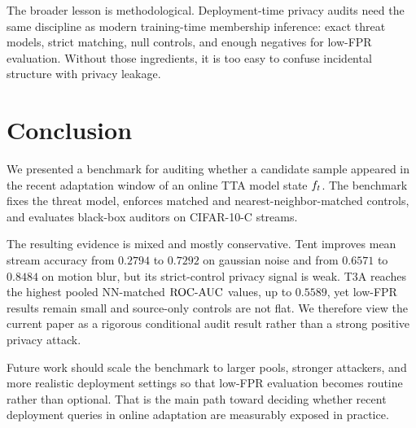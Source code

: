 The broader lesson is methodological. Deployment-time privacy audits need the same discipline as modern training-time membership inference: exact threat models, strict matching, null controls, and enough negatives for low-FPR evaluation. Without those ingredients, it is too easy to confuse incidental structure with privacy leakage.

\section{Conclusion}
\label{sec:conclusion}

We presented a benchmark for auditing whether a candidate sample appeared in the recent adaptation window of an online TTA model state $f_t$. The benchmark fixes the threat model, enforces matched and nearest-neighbor-matched controls, and evaluates black-box auditors on CIFAR-10-C streams.

The resulting evidence is mixed and mostly conservative. Tent improves mean stream accuracy from $0.2794$ to $0.7292$ on gaussian noise and from $0.6571$ to $0.8484$ on motion blur, but its strict-control privacy signal is weak. T3A reaches the highest pooled NN-matched $\mathrm{ROC\mbox{-}AUC}$ values, up to $0.5589$, yet low-FPR results remain small and source-only controls are not flat. We therefore view the current paper as a rigorous conditional audit result rather than a strong positive privacy attack.

Future work should scale the benchmark to larger pools, stronger attackers, and more realistic deployment settings so that low-FPR evaluation becomes routine rather than optional. That is the main path toward deciding whether recent deployment queries in online adaptation are measurably exposed in practice.





